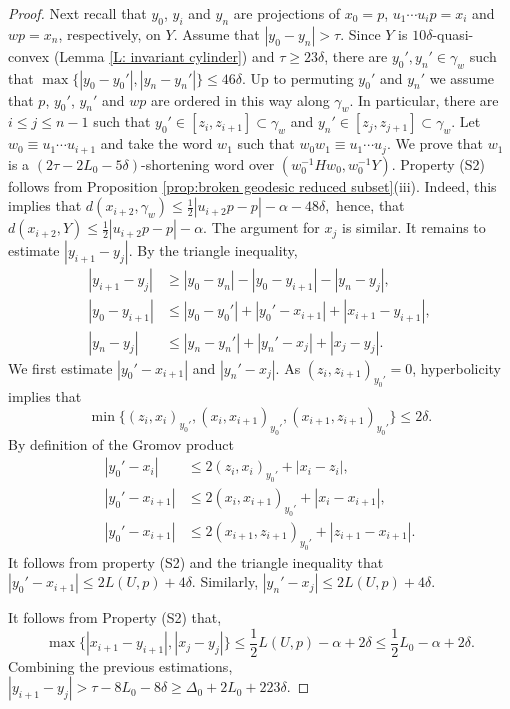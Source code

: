 \documentclass[leqno,a4paper,10pt]{amsart}
\theoremstyle{plain}
\theoremstyle{definition}
\theoremstyle{remark}
\let\le\leqslant
\let\ge\geqslant
\begin{document}
\begin{proof}
Next recall that $y_0$, $y_i$ and $y_n$ are projections of $x_0=p$, $u_1\cdots u_ip=x_i$ and $wp=x_n$, respectively, on $Y$.  Assume that $|y_0-y_n|>\tau$. Since $Y$ is $10\delta$-quasi-convex (Lemma \ref{L: invariant cylinder}) and $\tau \ge 23\delta$,  there are $y_0',y_n' \in \gamma_w$ such that 
	$\max\{|y_0-y_0'|, |y_n-y_n'|\} \le 46\delta.$ 
 Up to permuting $y_0'$ and $y_n'$ we assume that $p$, $y_0'$, $y_n'$ and $wp$ are ordered in this way along $\gamma_w$. In particular, there are $i\le j\le n-1$ such that $y_0'\in [z_i,z_{i+1}]\subset \gamma_w$ and $y_n'\in  [z_j,z_{j+1}]\subset \gamma_w$. Let $w_0\equiv u_1\cdots u_{i+1}$ and take the word $w_1$ such that $w_0w_1\equiv u_1\cdots u_j$. We  prove that $w_1$ is a $(2\tau-2L_0-5\delta)$-shortening word over $(w_0^{-1}Hw_0,w_0^{-1}Y)$. Property (S2) follows from Proposition \ref{prop:broken geodesic reduced subset}(iii). Indeed, this implies that 
	$d(x_{i+2},\gamma_w)\leqslant \frac{1}{2}|u_{i+2}p-p| -\alpha -48\delta,$ hence, that $d(x_{i+2},Y)\leqslant \frac{1}{2}|u_{i+2}p-p| -\alpha.$ The argument for $x_{j}$ is similar. It remains to estimate  $|y_{i+1}-y_j|$. By the triangle inequality,
	\begin{align*}
		|y_{i+1}-y_j|&\ge |y_0-y_n|-|y_0-y_{i+1}|-|y_n-y_j|,\\
		|y_0-y_{i+1}|&\le |y_0-y_0'|+|y_0'-x_{i+1}|+|x_{i+1}-y_{i+1}|,\\
		|y_n-y_j|&\le |y_n-y_n'|+|y_n'-x_j|+|x_j-y_j|.
	\end{align*}
	We first estimate $|y_0'-x_{i+1}|$ and $|y_n' -x_j|$. 
	 As $(z_i,z_{i+1})_{y_0'}=0$, hyperbolicity implies that  
	 $$\min\{(z_i,x_i)_{y_0'}, (x_i,x_{i+1})_{y_0'}, (x_{i+1},z_{i+1})_{y_0'}\}\leqslant 2\delta.$$ 
	By definition of the Gromov product 
\begin{align*}
|y_0'-x_i| & \leqslant 2(z_i,x_i)_{y_0'} +|x_i-z_i|,\\
 |y_0'-x_{i+1}|& \leqslant 2(x_i,x_{i+1})_{y_0'} +|x_i-x_{i+1}|,\\
  |y_0'-x_{i+1}|& \leqslant 2(x_{i+1},z_{i+1})_{y_0'} +|z_{i+1}-x_{i+1}|.   
\end{align*}	
It follows from property (S2) and the triangle inequality that $|y_0'-x_{i+1}|\leqslant 2L(U,p)+4\delta$. Similarly, $|y_n' -x_j|\leqslant 2L(U,p)+4\delta$. 

	It follows from Property (S2) that,
	$$
	\max\{|x_{i+1}-y_{i+1}|,|x_j-y_j|\}\le \frac{1}{2}L(U,p)-\alpha +2\delta \le \frac{1}{2} L_0-\alpha + 2\delta.
	$$
	Combining the previous estimations, $|y_{i+1}-y_j|>\tau-8L_0 -8\delta \ge \Delta_0+2L_0+223 \delta$.	
\end{proof}
\end{document}
